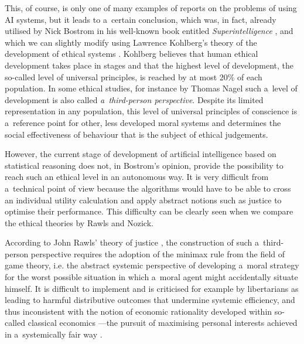 This, of course, is only one of many examples of reports on the problems of using AI systems, but it leads to a~certain conclusion, which was, in fact, already utilised by Nick Bostrom in his well-known book entitled \textit{Superintelligence}
\parencite[][p.306]{bostrom_superintelligence_2016}, %
 and which we can slightly modify using Lawrence Kohlberg's theory of the development of ethical systems 
\parencites[][]{kohlberg_development_1958}[see also][]{gornicka_rozwoj_1980}[][]{czyzowska_formy_1993}. %
 Kohlberg believes that human ethical development takes place in stages and that the highest level of development, the so-called level of universal principles, is reached by at most 20\% of each population. In some ethical studies, for instance by Thomas Nagel 
\parencite*[][p.208]{nagel_view_1986} %
 such a~level of development is also called \textit{a~third-person perspective}. Despite its limited representation in any population, this level of universal principles of conscience is a~reference point for other, less developed moral systems and determines the social effectiveness of behaviour that is the subject of ethical judgements.

However, the current stage of development of artificial intelligence based on statistical reasoning does not, in Bostrom's opinion, provide the possibility to reach such an ethical level in an autonomous way. It is very difficult from a~technical point of view because the algorithms would have to be able to cross an individual utility calculation and apply abstract notions such as justice to optimise their performance. This difficulty can be clearly seen when we compare the ethical theories by Rawls and Nozick.

According to John Rawls' theory of justice
\parencite[][]{rawls_theory_1971}, %
 the construction of such a~third-person perspective requires the adoption of the minimax rule from the field of game theory, i.e. the abstract systemic perspective of developing a~moral strategy for the worst possible situation in which a~moral agent might accidentally situate himself. It is difficult to implement 
\parencites[][]{arrow_ordinalist-utilitarian_1973}[][]{harsanyi_can_1975} %
 and is criticised for example by libertarians as leading to harmful distributive outcomes that undermine systemic efficiency, and thus inconsistent with the notion of economic rationality developed within so-called classical economics 
\parencite[][]{wysocki_problem_2021}%
—the pursuit of maximising personal interests achieved in a~systemically fair way 
\parencite[][]{nozick_anarchy_2013}.%


